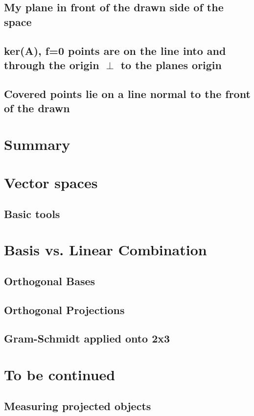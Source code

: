 \documentclass[a4paper]{article}
\begin{document}
\subsection{My plane in front of the drawn side of the space}
\subsection{ker(A), f=0 points are on the line into and through the origin $\perp$ to the planes origin}
\subsection{Covered points lie on a line normal to the front of the drawn}

\section{Summary}

\appendix

\section{Vector spaces}
\subsection{Basic tools}

\section{Basis vs. Linear Combination}
\subsection{Orthogonal Bases}
\subsection{Orthogonal Projections}
\subsection{Gram-Schmidt applied onto 2x3}

\section{To be continued}
\subsection{Measuring projected objects}
\end{document}
